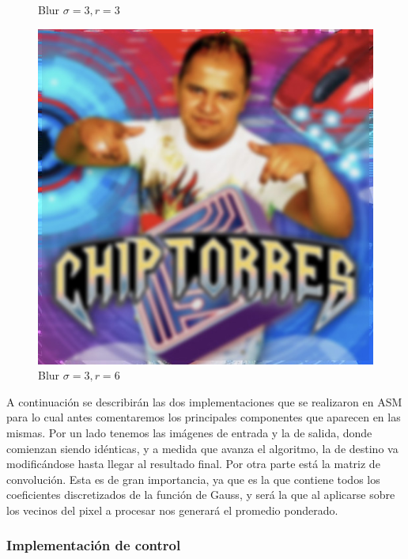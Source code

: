 \begin{figure}[H]
\begin{minipage}{.3\textwidth}
		\caption{Blur  $\sigma = 3, r = 3$}
		\label{fig:blur_s3_r3}
	\end{minipage}\hfill
	\begin{minipage}{.3\textwidth}
		\centering
		\includegraphics[width=\linewidth]{blur_s3_r6.jpg}
		\caption{Blur $\sigma = 3, r = 6$}
		\label{fig:blur_s3_r6}
	\end{minipage}
\end{figure}


A continuación se describirán las dos implementaciones que se realizaron en ASM
para lo cual antes comentaremos los principales componentes que aparecen
en las mismas. Por un lado tenemos las imágenes de entrada y la de salida, donde
comienzan siendo idénticas, y a medida que avanza el algoritmo, la de destino va
modificándose hasta llegar al resultado final. Por otra parte está la matriz de
convolución. Esta es de gran importancia, ya que es la que contiene todos los
coeficientes discretizados de la función de Gauss, y será la que al aplicarse
sobre los vecinos del pixel a procesar nos generará el promedio ponderado.

\subsubsection{Implementación de control}

